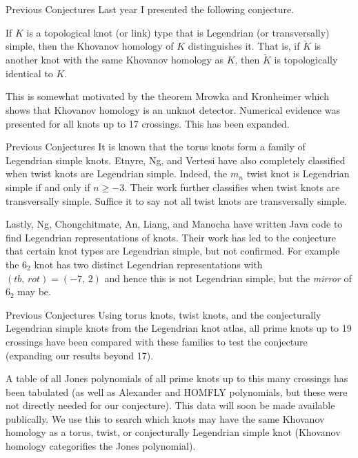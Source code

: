 \documentclass{beamer}
\begin{document}
    \begin{frame}{Previous Conjectures}
        Last year I presented the following conjecture.
        \begin{flushleft}
            If $K$ is a topological knot (or link) type that is Legendrian
            (or transversally) simple, then the Khovanov homology of $K$
            distinguishes it. That is, if $\tilde{K}$ is another knot with the
            same Khovanov homology as $K$, then $\tilde{K}$ is topologically
            identical to $K$.
        \end{flushleft}
        This is somewhat motivated by the theorem Mrowka and Kronheimer which
        shows that Khovanov homology is an unknot detector.
        Numerical evidence was presented for all knots up to 17 crossings.
        This has been expanded.
    \end{frame}
    \begin{frame}{Previous Conjectures}
        It is known that the torus knots form a family of Legendrian simple
        knots. Etnyre, Ng, and Vertesi have also completely classified when
        twist knots are Legendrian simple. Indeed, the $m_{n}$ twist knot is
        Legendrian simple if and only if $n\geq{-3}$. Their work further
        classifies when twist knots are transversally simple. Suffice it to say
        not all twist knots are transversally simple.
        \par\hfill\par
        Lastly, Ng, Chongchitmate, An, Liang, and Manocha have written Java
        code to find Legendrian representations of knots. Their work has led
        to the conjecture that certain knot types are Legendrian simple, but
        not confirmed. For example the $6_{2}$ knot has two
        distinct Legendrian representations with $(tb,\,rot)=(-7,\,2)$ and
        hence this is not Legendrian simple, but the \textit{mirror} of $6_{2}$
        may be.
    \end{frame}
    \begin{frame}{Previous Conjectures}
        Using torus knots, twist knots, and the conjecturally Legendrian simple
        knots from the Legendrian knot atlas, all prime knots up to 19
        crossings have been compared with these families to test the conjecture
        (expanding our results beyond 17).
        \par\hfill\par
        A table of all Jones polynomials of all prime knots up to this many
        crossings has been tabulated (as well as Alexander and HOMFLY
        polynomials, but these were not directly needed for our conjecture).
        This data will soon be made available publically. We use this to search
        which knots may have the same Khovanov homology as a torus, twist, or
        conjecturally Legendrian simple knot (Khovanov homology categorifies
        the Jones polynomial).
    \end{frame}
\end{document}
